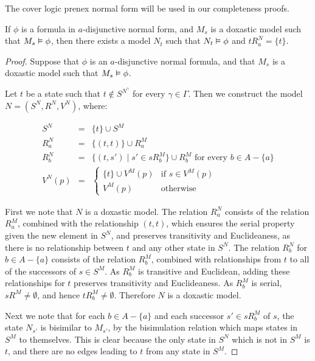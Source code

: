 The cover logic prenex normal form will be used in our completeness proofs.

\begin{lemma}\label{kd45-successors}
If $\phi$ is a formula in $a$-disjunctive normal form, and $M_s$ is a doxastic
model such that $M_s \vDash \phi$, then there exists a model $N_t$ such that
$N_t \vDash \phi$ and $tR^N_a = \{t\}$.
\end{lemma}

\begin{proof}
Suppose that $\phi$ is an $a$-disjunctive normal formula, and that $M_s$ is a
doxastic model such that $M_s \vDash \phi$. 

Let $t$ be a state such that $t \notin S^{N^\gamma}$ for every $\gamma \in
\Gamma$. Then we construct the model $N = (S^N, R^N, V^N)$, where:

\begin{eqnarray*}
S^N &=& \{t\} \cup S^M\\
R^N_a &=& \{(t, t)\} \cup R^M_a\\
R^N_b &=& \{(t, s') \mid s' \in sR^M_b\} \cup R^M_b \text{ for every $b \in A -
\{a\}$}\\
V^N(p) &=& \begin{cases}
\{t\} \cup V^M(p) & \text{if $s \in V^M(p)$}\\
V^M(p) & \text{otherwise}
\end{cases}
\end{eqnarray*}

First we note that $N$ is a doxastic model. The relation $R^N_a$ consists of the
relation $R^M_a$, combined with the relationship $(t,t)$, which ensures the
serial property given the new element in $S^N$, and preserves transitivity and
Euclideaness, as there is no relationship between $t$ and any other state in
$S^N$. The relation $R^N_b$ for $b \in A - \{a\}$ consists of the relation
$R^M_b$, combined with relationships from $t$ to all of the successors of $s \in
S^M$. As $R^M_b$ is transitive and Euclidean, adding these relationships for $t$
preserves transitivity and Euclideaness. As $R^M_b$ is serial, $sR^M \ne
\emptyset$, and hence $tR^M_b \ne \emptyset$. Therefore $N$ is a doxastic model.

Next we note that for each $b \in A - \{a\}$ and each successor $s' \in sR^M_b$
of $s$, the state $N_{s'}$ is bisimilar to $M_{s'}$, by the bisimulation
relation which maps states in $S^M$ to themselves. This is clear because the
only state in $S^N$ which is not in $S^M$ is $t$, and there are no edges leading
to $t$ from any state in $S^M$.


\end{proof}
